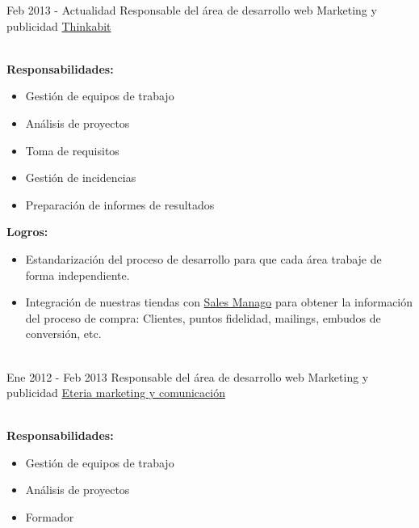 \documentclass[letterpaper]{twentysecondcv} %
\begin{document}
\begin{twenty} %
	\twentyitem%
	{Feb 2013 -}
	{Actualidad}
	{Responsable del área de desarrollo web}
	{Marketing y publicidad}
	{\href{http://www.thinkabit.es/}{Thinkabit}}
	{\\
		\textbf{Responsabilidades:}
		\begin{itemize}
			\item Gestión de equipos de trabajo
			\item Análisis de proyectos
			\item Toma de requisitos
			\item Gestión de incidencias
			\item Preparación de informes de resultados
		\end{itemize}

		\textbf{Logros:}
		\begin{itemize}
			\item Estandarización del proceso de desarrollo para que cada área trabaje de forma independiente.
			\item Integración de nuestras tiendas con \href{http://salesmanago.com/}{Sales Manago} para obtener la información del proceso de compra: Clientes, puntos fidelidad, mailings, embudos de conversión, etc.
		\end{itemize}
	}
	\\
	\twentyitem%
	{Ene 2012 -}
	{Feb 2013}
	{Responsable del área de desarrollo web}
	{Marketing y publicidad}
	{\href{http://www.eteria.es}{Eteria marketing y comunicación}}
	{\\
		\textbf{Responsabilidades:}
		\begin{itemize}
			\item Gestión de equipos de trabajo
			\item Análisis de proyectos
			\item Formador
		\end{itemize}

}
\end{twenty}
\end{document}
